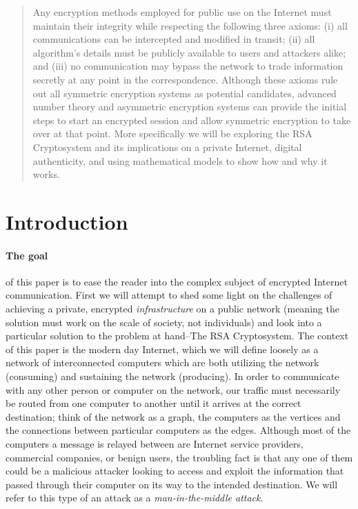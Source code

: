 \documentclass[12pt]{article}
\theoremstyle{remark}
\begin{document}
\maketitle

\begin{abstract}
Any encryption methods employed for public use on the Internet must maintain their integrity while respecting the following three axioms: (i) all communications can be intercepted and modified in transit; (ii) all algorithm's details must be publicly available to users and attackers alike; and (iii) no communication may bypass the network to trade information secretly at any point in the correspondence.  Although these axioms rule out all symmetric encryption systems as potential candidates, advanced number theory and asymmetric encryption systems can provide the initial steps to start an encrypted session and allow symmetric encryption to take over at that point.  More specifically we will be exploring the RSA Cryptosystem and its implications on a private Internet, digital authenticity, and using mathematical models to show how and why it works.  
\end{abstract}



\section{Introduction}

\paragraph{The goal} of this paper is to ease the reader into the complex subject of encrypted Internet communication.  First we will attempt to shed some light on the challenges of achieving a private, encrypted \textit{infrastructure} on a public network (meaning the solution must work on the scale of society, not individuals) and look into a particular solution to the problem at hand--The RSA Cryptosystem.  The context of this paper is the modern day Internet, which we will define loosely as a network of interconnected computers which are both utilizing the network (consuming) and sustaining the network (producing).  In order to communicate with any other person or computer on the network, our traffic must necessarily be routed from one computer to another until it arrives at the correct destination; think of the network as a graph, the computers as the vertices and the connections between particular computers as the edges.  Although most of the computers a message is relayed between are Internet service providers, commercial companies, or benign users, the troubling fact is that any one of them could be a malicious attacker looking to access and exploit the information that passed through their computer on its way to the intended destination.  We will refer to this type of an attack as a \textit{man-in-the-middle attack}.
\end{document}
